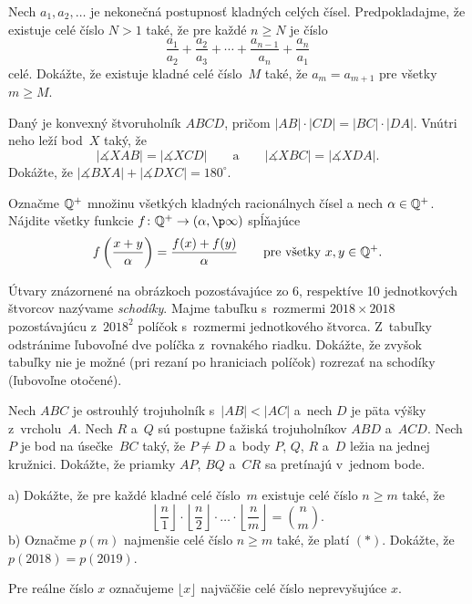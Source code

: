 {%
Nech $a_1, a_2, \dots$ je nekonečná postupnosť kladných celých čísel. Predpokladajme, že existuje celé číslo $N>1$ také, že pre každé $n \ge N$ je číslo
$$
\frac{a_1}{a_2} + \frac{a_2}{a_3} + \cdots + \frac{a_{n-1}}{a_n} + \frac{a_n}{a_1}$$
celé.
Dokážte, že existuje kladné celé číslo~$M$ také, že $a_m = a_{m+1}$ pre všetky $m \ge M$.}

{%
Daný je konvexný štvoruholník $ABCD$, pričom $|AB| \cdot |CD| = |BC| \cdot |DA|$. Vnútri neho leží bod~$X$ taký, že
$$
|\measuredangle XAB| = |\measuredangle XCD| \qquad \text{a} \qquad |\measuredangle XBC|=|\measuredangle XDA|.
$$
Dokážte, že $|\measuredangle BXA| + |\measuredangle DXC| = 180^\circ$.}

{%
Označme $\Bbb Q^+$ množinu všetkých kladných racionálnych čísel a nech $\alpha\in \Bbb Q^+$.
Nájdite všetky funkcie $f\colon \Bbb Q^{+} \to (\alpha,\p\infty)$ spĺňajúce
$$
f\left(\frac{x+y}{\alpha}\right) = \frac{f(x)+f(y)}{\alpha}\qquad\text{pre všetky $x,y \in \Bbb{Q}^{+}$.}
$$
}

{%
Útvary znázornené na obrázkoch pozostávajúce zo 6, respektíve 10 jednotkových štvorcov nazývame {\it schodíky}.
Majme tabuľku s~rozmermi $2018\times 2018$ pozostávajúcu z~$2018^2$ políčok s~rozmermi jednotkového štvorca. Z~tabuľky odstránime ľubovoľné dve políčka z~rovnakého riadku. Dokážte, že zvyšok tabuľky nie je možné (pri rezaní po hraniciach políčok) rozrezať na schodíky (ľubovoľne otočené).
}

{%
Nech $ABC$ je ostrouhlý trojuholník s~$|AB|<|AC|$ a~nech $D$ je päta výšky z~vrcholu~$A$. Nech $R$ a~$Q$ sú postupne ťažiská trojuholníkov $ABD$ a~$ACD$. Nech $P$ je bod na úsečke~$BC$ taký, že $P \ne D$ a~body $P$, $Q$, $R$ a~$D$ ležia na jednej kružnici. Dokážte, že priamky $AP$, $BQ$ a~$CR$ sa pretínajú v~jednom bode.}

{%
\ite a) Dokážte, že pre každé kladné celé číslo~$m$ existuje celé číslo $n\ge m$ také, že
$$
\left\lfloor\frac{n}{1}\right\rfloor\cdot\left\lfloor\frac{n}{2}\right\rfloor\cdot\dots\cdot\left\lfloor\frac{n}{m}\right\rfloor = {n \choose m}. \tag{$*$}
$$
\ite b) Označme $p(m)$ najmenšie celé číslo $n\ge m$ také, že platí $(*)$. Dokážte, že $p(2018)=p(2019)$.

Pre reálne číslo $x$ označujeme $\lfloor x\rfloor$ najväčšie celé číslo neprevyšujúce $x$.
}


